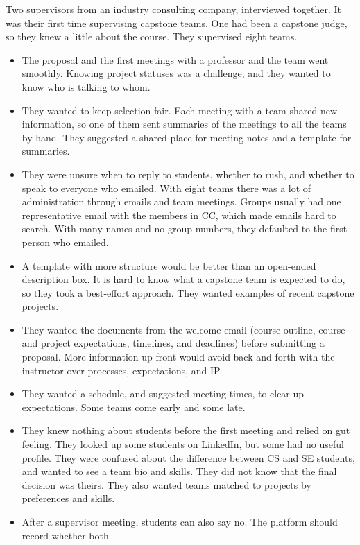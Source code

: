 \documentclass{article}
\begin{document}
    Two supervisors from an industry consulting company, interviewed together. It was their first time supervising
    capstone teams. One had been a capstone judge, so they knew a little about the course. They supervised eight
    teams.
    \begin{itemize}
        \item The proposal and the first meetings with a professor and the team went smoothly. Knowing project
        statuses was a challenge, and they wanted to know who is talking to whom.
        \item They wanted to keep selection fair. Each meeting with a team shared new information, so one of them
        sent summaries of the meetings to all the teams by hand. They suggested a shared place for meeting notes
        and a template for summaries.
        \item They were unsure when to reply to students, whether to rush, and whether to speak to everyone who
        emailed. With eight teams there was a lot of administration through emails and team meetings.
        Groups usually had one representative email with the members in CC, which made emails hard to search.
        With many names and no group numbers, they defaulted to the first person who emailed.
        \item A template with more structure would be better than an open-ended description box. It is hard to
        know what a capstone team is expected to do, so they took a best-effort approach. They wanted
        examples of recent capstone projects.
        \item They wanted the documents from the welcome email (course outline, course and project expectations,
        timelines, and deadlines) before submitting a proposal. More information up front would avoid
        back-and-forth with the instructor over processes, expectations, and IP.
        \item They wanted a schedule, and suggested meeting times, to clear up expectations. Some teams come early
        and some late.
        \item They knew nothing about students before the first meeting and relied on gut feeling. They looked up some
        students on LinkedIn, but some had no useful profile. They were confused about the difference between
        CS and SE students, and wanted to see a team bio and skills. They did not know that the final decision
        was theirs. They also wanted teams matched to projects by preferences and skills.
        \item After a supervisor meeting, students can also say no. The platform should record whether both

\end{itemize}
\end{document}
